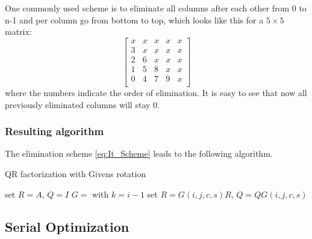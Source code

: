 \documentclass[a4paper]{scrartcl}
\begin{document}
        One commonly used scheme is to eliminate all columns after each other from 0
        to n-1 and per column go from bottom to top, which looks like this for a $5\times 5$ matrix:
        \begin{equation}\label{eq:It_Scheme}
            \begin{bmatrix}
                x & x & x & x & x \\
                3 & x & x & x & x \\
                2 & 6 & x & x & x \\
                1 & 5 & 8 & x & x \\
                0 & 4 & 7 & 9 & x \\
            \end{bmatrix}
        \end{equation}
        where the numbers indicate the order of elimination. It is easy to see that
        now all previously eliminated columns will stay 0.


        \subsubsection{Resulting algorithm}
            The elimination scheme \ref{eq:It_Scheme} leads to the following
            algorithm.
            \begin{algorithm}[H]
                \caption{QR factorization with Givens rotation}\label{alg:QR_Givens}
                \begin{algorithmic}[1]
                \State set $R=A$, $Q=I$
                        \State $G =$  with $k=i-1$
                        \State set $R=G(i,j,c,s) R$, $Q = Q G(i,j,c,s)$
                    \EndFor
                \EndFor
                \EndProcedure
                \end{algorithmic}
            \end{algorithm}

    \subsection{Serial Optimization}\label{sub:Serial}
\end{document}
